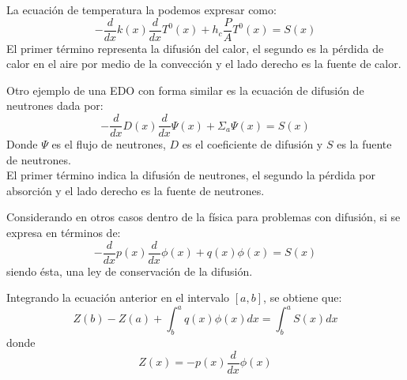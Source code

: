 \begin{frame}
La ecuaci\'{o}n de temperatura la podemos expresar como:
\[ - \dfrac{d}{dx}k(x) \dfrac{d}{dx} T^{0}(x) + h_{c} \dfrac{P}{A} T^{0}(x) = S(x) \]
El primer t\'{e}rmino representa la difusi\'{o}n del calor, el segundo es la p\'{e}rdida de calor en el aire por medio de la convecci\'{o}n y el lado derecho es la fuente de calor.
\end{frame}
\begin{frame}
Otro ejemplo de una EDO con forma similar es la ecuaci\'{o}n de difusi\'{o}n de neutrones dada por:
\[ - \dfrac{d}{dx} D(x) \dfrac{d}{dx} \Psi (x) + \Sigma_{a} \Psi (x) = S(x) \]
Donde $\Psi$ es el flujo de neutrones, $D$ es el coeficiente de difusi\'{o}n y $S$ es la fuente de neutrones.
\\
\bigskip
El primer t\'{e}rmino indica la difusi\'{o}n de neutrones, el segundo la p\'{e}rdida por absorci\'{o}n y el lado derecho es la fuente de neutrones.
\end{frame}
\begin{frame}
Considerando en otros casos dentro de la f\'{i}sica para problemas con difusi\'{o}n, si se expresa en t\'{e}rminos de:
\[- \dfrac{d}{dx} p(x) \dfrac{d}{dx} \phi (x) + q(x) \phi (x) = S(x)  \]
siendo \'{e}sta, una ley de conservaci\'{o}n de la difusi\'{o}n.
\end{frame}
\begin{frame}
Integrando la ecuaci\'{o}n anterior en el intervalo $[a,b]$, se obtiene que:
\[ Z(b) - Z(a) + \int_{b}^{a} q(x) \phi (x) dx = \int_{b}^{a} S(x) dx \]
donde
\[ Z(x) = - p(x) \dfrac{d}{dx} \phi (x) \]
\end{frame}
